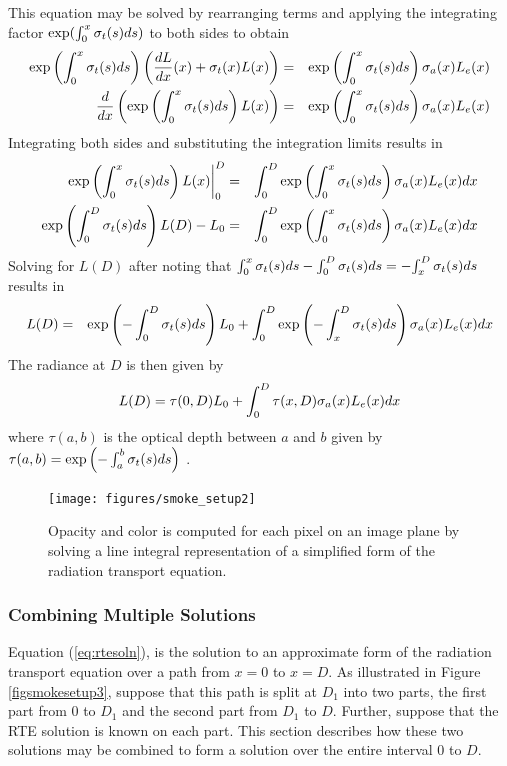 This equation may be solved by rearranging terms and applying the
integrating factor $\exp(\int_0^x \sigma_t(s) ds)$ to both sides to
obtain
\begin{eqnarray*}
\exp\left({\int_0^x \sigma_t(s) ds}\right)\left(\frac{dL}{dx}(x)+\sigma_t(x) L(x)\right)&=&  \exp\left({\int_0^x \sigma_t(s) ds}\right)\sigma_a(x) L_e(x)\\
\frac{d}{dx}\left(\exp\left({\int_0^x \sigma_t(s) ds}\right) L(x)\right)&=& \exp\left({\int_0^x \sigma_t(s) ds}\right)\sigma_a(x) L_e(x)
\end{eqnarray*}
Integrating both sides and substituting the integration limits
results in
\begin{eqnarray*}
\left.\exp\left({\int_0^x \sigma_t(s) ds}\right) L(x)\right|_0^D&=& \int_0^D\exp\left({\int_0^x \sigma_t(s) ds}\right)\sigma_a(x) L_e(x) dx \\
\exp\left({\int_0^D \sigma_t(s) ds}\right) L(D)-L_0&=& \int_0^D\exp\left({\int_0^x \sigma_t(s) ds}\right)\sigma_a(x) L_e(x) dx
\end{eqnarray*}
Solving for $L(D)$ after noting that
${\int_0^x \sigma_t(s) ds}-{\int_0^D \sigma_t(s) ds}=-{\int_x^D \sigma_t(s) ds}$ results in
\begin{eqnarray*}
L(D)&=&\exp\left({-\int_0^D \sigma_t(s) ds}\right) L_0+ \int_0^D\exp\left({-\int_x^D \sigma_t(s) ds}\right)\sigma_a(x) L_e(x) dx\\
\end{eqnarray*}
The radiance at $D$ is then given by
\begin{equation}
 L(D)=\tau(0,D)L_0 + \int_0^D\tau(x,D)\sigma_a(x)L_e(x) dx
\end{equation}
where $\tau(a,b)$ is the optical depth between $a$ and $b$ given
by $\tau(a,b)=\exp\left({-\int_a^b \sigma_t(s) ds}\right)$ .

\begin{figure}[\figoptions]
\begin{center}
\texttt{[image: figures/smoke\_setup2]}
\end{center}
\caption {Opacity and color is computed for each pixel on an image plane by solving a line integral
representation of a simplified form of the radiation transport equation.
}
\label{figsmokesetup2}
\end{figure}

%
%

\subsubsection{Combining Multiple Solutions}
Equation (\ref{eq:rtesoln}), is the solution to an approximate form of the radiation transport equation over a path
from $x=0$ to $x=D$.  As illustrated in Figure \ref{figsmokesetup3},
suppose that this path is split at $D_1$ into two parts, the first part from $0$ to $D_1$ and the second part from $D_1$ to $D$.
Further, suppose that the RTE solution is known on each part.
This section describes how these two solutions may be combined to form a solution
over the entire interval $0$ to $D$.

